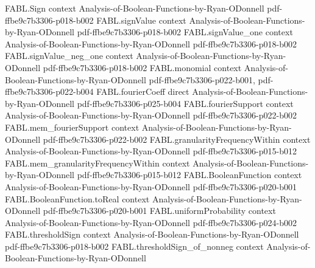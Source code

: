 \begin{theorem}
\label{FABL.two_mul_minorityProbability_mul_logb_inv_le_totalInfluence}
\leanok
{}
\proofstep
  {FABL.Sign}
  {context}
  {Analysis-of-Boolean-Functions-by-Ryan-ODonnell}
  {pdf-ffbe9c7b3306-p018-b002}
\proofstep
  {FABL.signValue}
  {context}
  {Analysis-of-Boolean-Functions-by-Ryan-ODonnell}
  {pdf-ffbe9c7b3306-p018-b002}
\proofstep
  {FABL.signValue_one}
  {context}
  {Analysis-of-Boolean-Functions-by-Ryan-ODonnell}
  {pdf-ffbe9c7b3306-p018-b002}
\proofstep
  {FABL.signValue_neg_one}
  {context}
  {Analysis-of-Boolean-Functions-by-Ryan-ODonnell}
  {pdf-ffbe9c7b3306-p018-b002}
\proofstep
  {FABL.monomial}
  {context}
  {Analysis-of-Boolean-Functions-by-Ryan-ODonnell}
  {pdf-ffbe9c7b3306-p022-b001,
    pdf-ffbe9c7b3306-p022-b004}
\proofstep
  {FABL.fourierCoeff}
  {direct}
  {Analysis-of-Boolean-Functions-by-Ryan-ODonnell}
  {pdf-ffbe9c7b3306-p025-b004}
\proofstep
  {FABL.fourierSupport}
  {context}
  {Analysis-of-Boolean-Functions-by-Ryan-ODonnell}
  {pdf-ffbe9c7b3306-p022-b002}
\proofstep
  {FABL.mem_fourierSupport}
  {context}
  {Analysis-of-Boolean-Functions-by-Ryan-ODonnell}
  {pdf-ffbe9c7b3306-p022-b002}
\proofstep
  {FABL.granularityFrequencyWithin}
  {context}
  {Analysis-of-Boolean-Functions-by-Ryan-ODonnell}
  {pdf-ffbe9c7b3306-p015-b012}
\proofstep
  {FABL.mem_granularityFrequencyWithin}
  {context}
  {Analysis-of-Boolean-Functions-by-Ryan-ODonnell}
  {pdf-ffbe9c7b3306-p015-b012}
\proofstep
  {FABL.BooleanFunction}
  {context}
  {Analysis-of-Boolean-Functions-by-Ryan-ODonnell}
  {pdf-ffbe9c7b3306-p020-b001}
\proofstep
  {FABL.BooleanFunction.toReal}
  {context}
  {Analysis-of-Boolean-Functions-by-Ryan-ODonnell}
  {pdf-ffbe9c7b3306-p020-b001}
\proofstep
  {FABL.uniformProbability}
  {context}
  {Analysis-of-Boolean-Functions-by-Ryan-ODonnell}
  {pdf-ffbe9c7b3306-p024-b002}
\proofstep
  {FABL.thresholdSign}
  {context}
  {Analysis-of-Boolean-Functions-by-Ryan-ODonnell}
  {pdf-ffbe9c7b3306-p018-b002}
\proofstep
  {FABL.thresholdSign_of_nonneg}
  {context}
  {Analysis-of-Boolean-Functions-by-Ryan-ODonnell}

\end{theorem}
